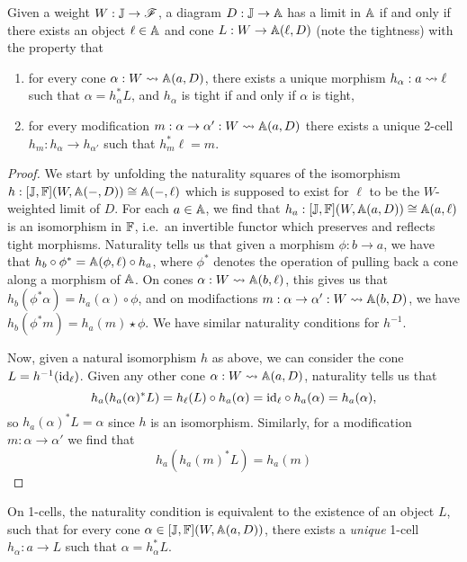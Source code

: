 \documentclass[../thesis.tex]{subfiles}
\begin{document}
  \begin{proposition}
    Given a weight $W : {\mathbb{J}} \to {\mathscr{F}}$, a diagram $D : {\mathbb{J}} \to {\mathbb{A}}$ has a limit in ${\mathbb{A}}$ if and only if there
    exists an object $\ell \in {\mathbb{A}}$ and cone $L : W \to {\mathbb{A}}(\ell,D)$ (note the tightness) with the property that
    \begin{enumerate}
      \item for every cone $\alpha : W \rightsquigarrow {\mathbb{A}}(a,D)$, there exists a unique morphism $h_\alpha : a \rightsquigarrow \ell$
        such that $\alpha = h_\alpha^*L$, and $h_\alpha$ is tight if and only if $\alpha$ is tight,
      \item for every modification $m : \alpha \to \alpha' : W \rightsquigarrow {\mathbb{A}}(a,D)$ there exists a unique 2-cell
        $h_m : h_\alpha \to h_{\alpha'}$ such that $h_m^*\ell = m$.
    \end{enumerate}
  \end{proposition}
  \begin{proof}
    We start by unfolding the naturality squares of the isomorphism $h : [{\mathbb{J}},{\mathbb{F}}](W,{\mathbb{A}}(-,D)) \cong {\mathbb{A}}(-,\ell)$
    which is supposed to exist for $\ell$ to be the $W$-weighted limit of $D$. For each $a \in {\mathbb{A}}$, we find that
    $h_a : [{\mathbb{J}},{\mathbb{F}}](W,{\mathbb{A}}(a,D)) \cong {\mathbb{A}}(a,\ell)$ is an isomorphism in ${\mathbb{F}}$, i.e.\ an invertible functor which
    preserves and reflects tight morphisms. Naturality tells us that given a morphism $\phi : b \to a$, we have
    that $h_b \circ \phi^* = {\mathbb{A}}(\phi,\ell) \circ h_a$, where $\phi^*$ denotes the operation of pulling back a 
    cone along a morphism of ${\mathbb{A}}$. On cones $\alpha : W \rightsquigarrow {\mathbb{A}}(b,\ell)$, this gives us that $h_b(\phi^*
    \alpha) = h_a(\alpha) \circ \phi$, and on modifactions $m : \alpha \to \alpha' : W \rightsquigarrow {\mathbb{A}}(b,D)$, we
    have $h_b(\phi^*m) = h_a(m) \star \phi$. We have similar naturality conditions for $h^{-1}$.
    
    Now, given a natural isomorphism $h$ as above, we can consider the cone $L = h^{-1}(\mathrm{id}_\ell)$. Given any
    other cone $\alpha : W \rightsquigarrow {\mathbb{A}}(a,D)$, naturality tells us that
    \[h_a(h_a(\alpha)^*L) = h_\ell(L) \circ h_a(\alpha) = \mathrm{id}_\ell \circ h_a(\alpha) = h_a(\alpha),\]
    so $h_a(\alpha)^*L = \alpha$ since $h$ is an isomorphism. Similarly, for a modification $m : \alpha \to
    \alpha'$ we find that
    \[h_a(h_a(m)^*L) = h_a(m)\]
  \end{proof}

  On 1-cells, the naturality condition is equivalent to the existence of an object $L$, such that for every
  cone $\alpha \in [{\mathbb{J}},{\mathbb{F}}](W,{\mathbb{A}}(a,D))$, there exists a \emph{unique} 1-cell $h_\alpha : a \to L$ such that
  $\alpha = h_\alpha^* L$.
\end{document}
